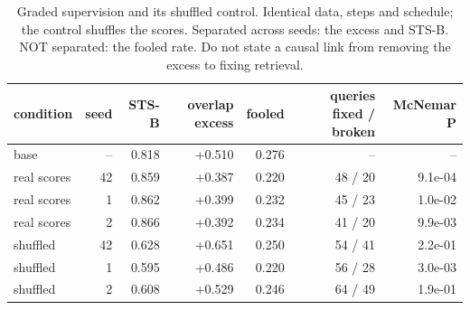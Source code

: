 \begin{table}[t]
\centering
\small
\caption{Graded supervision and its shuffled control. Identical data, steps and schedule; the control shuffles the scores. Separated across seeds: the excess and STS-B. NOT separated: the fooled rate. Do not state a causal link from removing the excess to fixing retrieval.}
\begin{tabular}{lrrrrrr}
\toprule
condition & seed & STS-B & overlap excess & fooled & queries fixed / broken & McNemar P \\
\midrule
base & -- & 0.818 & +0.510 & 0.276 & -- & -- \\
real scores & 42 & 0.859 & +0.387 & 0.220 & 48 / 20 & 9.1e-04 \\
real scores & 1 & 0.862 & +0.399 & 0.232 & 45 / 23 & 1.0e-02 \\
real scores & 2 & 0.866 & +0.392 & 0.234 & 41 / 20 & 9.9e-03 \\
shuffled & 42 & 0.628 & +0.651 & 0.250 & 54 / 41 & 2.2e-01 \\
shuffled & 1 & 0.595 & +0.486 & 0.220 & 56 / 28 & 3.0e-03 \\
shuffled & 2 & 0.608 & +0.529 & 0.246 & 64 / 49 & 1.9e-01 \\
\bottomrule
\end{tabular}
\end{table}
